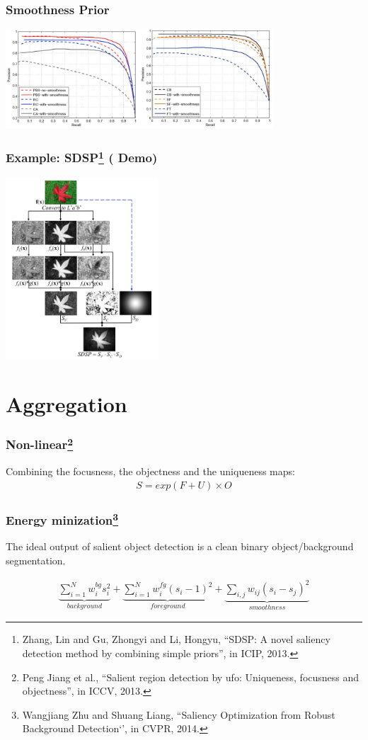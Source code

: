 \documentclass[notheorems,serif,table,compress]{beamer}  %
\begin{document}
\begin{frame}
\frametitle{{\color{magenta}} Smoothness Prior}
\centering\includegraphics[width=10cm]{smoothness}
\end{frame}


\begin{frame}
\frametitle{Example: SDSP\footnote{Zhang, Lin and Gu, Zhongyi and Li, Hongyu, ``SDSP: A novel saliency detection method by combining simple priors'', in ICIP, 2013.}   (\color{yellow} \textbf{Demo})}

\centering\includegraphics[width=5.7cm]{SDSP}
\end{frame}


\section{Aggregation}

\begin{frame}
\frametitle{{\color{magenta}} Non-linear\footnote{Peng Jiang et al., ``Salient region detection by ufo: Uniqueness, focusness and objectness'', in ICCV, 2013. }}
Combining the focusness, the objectness and the uniqueness maps:
\begin{align}
S = exp( F + U) \times O
\end{align}
\end{frame}


\begin{frame}
\frametitle{{\color{magenta}} Energy minization\footnote{Wangjiang Zhu and Shuang Liang, ``Saliency Optimization from Robust Background Detection‘’, in CVPR, 2014.}}
The ideal output of salient object detection is a clean binary object/background segmentation.

\begin{align}
\underbrace{\sum_{i=1}^{N}w_i^{bg}s_i^2}_{background}+\underbrace{\sum_{i=1}^{N}w_i^{fg}(s_i-1)^2}_{foreground}+\underbrace{\sum_{i, j}w_{ij}(s_i-s_j)^2}_{smoothness}
\end{align}
\end{frame}
\end{document}
